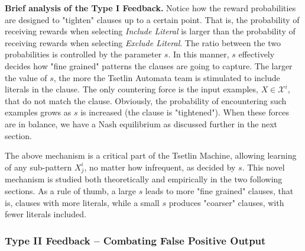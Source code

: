 \documentclass[11pt,a4paper]{article}
\begin{document}
{\bf Brief analysis of the Type I Feedback.} Notice how the reward probabilities are designed to "tighten" clauses up to a certain point. That is, the probability of receiving rewards when selecting \emph{Include Literal} is larger than the probability of receiving rewards when selecting \emph{Exclude Literal}. The ratio between the two probabilities is controlled by the parameter $s$. In this manner, $s$ effectively decides how "fine grained" patterns the clauses are going to capture. The larger the value of $s$, the more the Tsetlin Automata team is stimulated to include literals in the clause. The only countering force is the input examples, $X \in \mathcal{X}^i$, that do not match the clause. Obviously, the probability of encountering such examples grows as $s$ is increased (the clause is "tightened"). When these forces are in balance, we have a Nash equilibrium as discussed further in the next section. 

 The above mechanism is a critical part of the Tsetlin Machine, allowing learning of any sub-pattern $X^i_j$, no matter how infrequent, as decided by $s$. This novel mechanism is studied both theoretically and empirically in the two following sections. As a rule of thumb, a large $s$ leads to more "fine grained" clauses, that is, clauses with more literals, while a small $s$ produces "coarser" clauses, with fewer literals included.

\subsubsection{Type II Feedback -- Combating False Positive Output }
\end{document}
